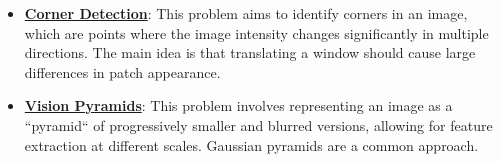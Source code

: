 \documentclass{article}%
\begin{document}
\begin{itemize}[leftmargin=*]
\item \href{https://purdue.brightspace.com/d2l/common/assets/pdfjs-d2l-dist/1.0.14-legacy/web/viewer.html?file=\%2Fcontent\%2Fenforced\%2F1095467-wl.202510.CS.24300.001\%2F08L2-Feature Extraction.pdf\%3Fou\%3D1095467\&lang=en-us\&container=d2l-fileviewer-rendered-pdf\&fullscreen=d2l-fileviewer-rendered-pdf-dialog\&height=667#page=20}{\textbf{Corner Detection}}: This problem aims to identify corners in an image, which are points where the image intensity changes significantly in multiple directions. The main idea is that translating a window should cause large differences in patch appearance.%
\item \href{https://purdue.brightspace.com/d2l/common/assets/pdfjs-d2l-dist/1.0.14-legacy/web/viewer.html?file=\%2Fcontent\%2Fenforced\%2F1095467-wl.202510.CS.24300.001\%2F08L2-Feature Extraction.pdf\%3Fou\%3D1095467\&lang=en-us\&container=d2l-fileviewer-rendered-pdf\&fullscreen=d2l-fileviewer-rendered-pdf-dialog\&height=667#page=30}{\textbf{Vision Pyramids}}: This problem involves representing an image as a ``pyramid`` of progressively smaller and blurred versions, allowing for feature extraction at different scales. Gaussian pyramids are a common approach.%
\end{itemize}

%
\end{document}
